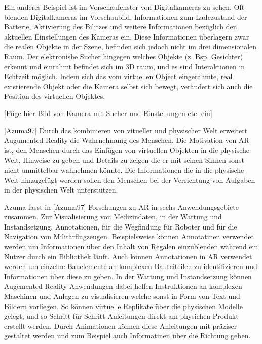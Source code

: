 Ein anderes Beispiel ist im Vorschaufenster von Digitalkameras zu sehen. Oft blenden Digitalkameras im Vorschaubild, Informationen zum Ladezustand der Batterie, Aktivierung des Bilitzes und weitere 
Informationen bezüglich den aktuellen Einstellungen des Kameras ein. Diese Informationen überlagern zwar die realen Objekte in der Szene, befinden sich jedoch nicht im drei dimensionalen Raum. 
Der elektronishe Sucher hingegen welches Objekte (z. Bsp. Gesichter) erkennt und einrahmt befindet sich im 3D raum, und es sind Interaktionen in Echtzeit möglich. Indem sich das vom virtuellen  Object 
eingerahmte, real existierende Objekt oder die Kamera selbst sich bewegt, verändert sich auch die Position des virtuellen Objektes. 

[Füge hier Bild von Kamera mit Sucher und Einstellungen etc. ein]

[Azuma97] Durch das kombinieren von vitueller und physischer Welt erweitert Augumented Reality die Wahrnehmung des Menschen. Die Motivation von AR ist, den Menschen durch das Einfügen
von virtuellen Objekten in die physische Welt, Hinweise zu geben und Details zu zeigen die er mit seinen Sinnen sonst nicht unmittelbar wahnehmen könnte. Die Informationen die in die physische 
Welt hinzugefügt werden sollen den Menschen bei der Verrichtung von Aufgaben in der physischen Welt unterstützen.

Azuma fasst in [Azuma97]  Forschungen zu AR in sechs Anwendungsgebiete zusammen. Zur Visualisierung von Medizindaten, in der Wartung 
und Instandsetzung, Annotationen, für die Wegfindung für Roboter und für die Navigation von Militärflugzeugen. Beispielsweise können Annotatinen 
verwendet werden um Informationen über den Inhalt von Regalen einzublenden während ein Nutzer durch ein Bibliothek läuft. %
Auch können Annotationen in AR verwendet werden um einzelne Bauelemente an komplexen Bauteiteilen zu identifizieren und Informationen über diese zu geben. 
In der Wartung und Instandsetzung können Augemented Reality Anwendungen dabei helfen Instruktionen an komplexen Maschinen und Anlagen zu visualisieren welche sonst in 
Form von Text und Bildern vorliegen. So können virtuelle Replikate über die physischen Modelle gelegt, und so Schritt für Schritt Anleitungen direkt am physichen Produkt erstellt werden. 
Durch Animationen können diese Anleitungen mit präziser gestaltet werden und zum Beispiel auch Informatinen über die Richtung geben. 

